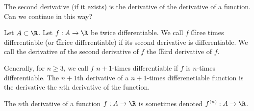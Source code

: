 

The second derivative (if it exists) is the derivative of the derivative of a function.
Can we continue in this way?


Let $A \subset \R$.
Let $f: A \to \R$ be twice differentiable.
We call $f$ \t{three times differentiable} (or \t{thrice differentiable}) if its second derivative is differentiable.
We call the derivative of the second derivative of $f$ the \t{third derivative} of $f$.

Generally, for $n \geq 3$, we call $f$ \t{$n+1$-times differentiable} if $f$ is $n$-times differentiable.
The \t{$n+1$th derivative} of a $n+1$-times differenetiable function is the derivative the $n$th derivative of the function.


The $n$th derivative of a function $f: A \to \R$ is sometimes denoted $f^{(n)}: A \to \R$.

\blankpage
